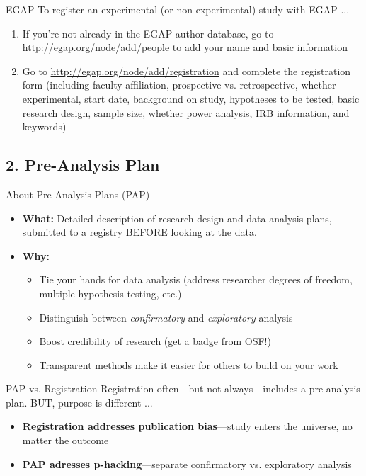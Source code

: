 \documentclass[12pt, compress]{beamer} %
\let\noteitem\item %
\renewcommand{\item}{ 
	\noteitem\vspace{\fill}
	}
\begin{document}
	\begin{frame}{EGAP}
		To register an experimental (or non-experimental) study with EGAP ... 
		\begin{enumerate}
			\item If you're not already in the EGAP author database, go to \url{http://egap.org/node/add/people} to add your name and basic information 
			\item Go to \url{http://egap.org/node/add/registration} and complete the registration form (including faculty affiliation, prospective vs. retrospective, whether experimental, start date, background on study, hypotheses to be tested, basic research design, sample size, whether power analysis, IRB information, and keywords)
		\end{enumerate}
	\end{frame}	

	
\subsection{2. Pre-Analysis Plan}

	\begin{frame}{About Pre-Analysis Plans (PAP)}
		\begin{itemize}
			\item \textbf{What:} Detailed description of research design and data analysis plans, submitted to a registry BEFORE looking at the data.
			\item \textbf{Why:} 
				\begin{itemize}
				 	\item Tie your hands for data analysis (address researcher degrees of freedom, multiple hypothesis testing, etc.)
				 	\item Distinguish between \textit{confirmatory} and \textit{exploratory} analysis
				 	\item Boost credibility of research (get a badge from OSF!)
				 	\item Transparent methods make it easier for others to build on your work
				\end{itemize}
		\end{itemize}
	\end{frame}
	
	\begin{frame}{PAP vs. Registration}
		Registration often---but not always---includes a pre-analysis plan. BUT, purpose is different ...
		\begin{itemize}
			\item \textbf{Registration addresses publication bias}---study enters the universe, no matter the outcome 
			\item \textbf{PAP adresses p-hacking}---separate confirmatory vs. exploratory analysis
		\end{itemize}	
		\bigskip
	\end{frame}
\end{document}
